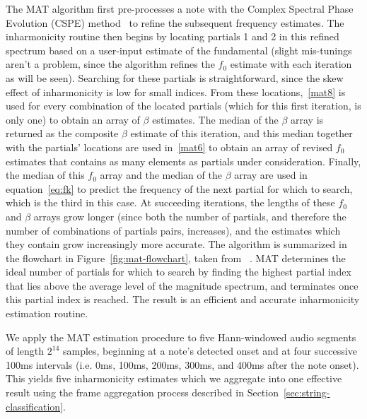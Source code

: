 \documentclass[12pt]{cmuthesis}
\begin{document}
The MAT algorithm first pre-processes a note with the Complex Spectral Phase Evolution (CSPE) method~\cite{short2006} to refine the subsequent frequency estimates. The inharmonicity routine then begins by locating partials 1 and 2 in this refined spectrum based on a user-input estimate of the fundamental (slight mis-tunings aren't a problem, since the algorithm refines the $f_0$ estimate with each iteration as will be seen). Searching for these partials is straightforward, since the skew effect of inharmonicity is low for small indices. From these locations,~\eqref{mat8} is used for every combination of the located partials (which for this first iteration, is only one) to obtain an array of $\beta$ estimates. The median of the $\beta$ array is returned as the composite $\beta$ estimate of this iteration, and this median together with the partials' locations are used in~\eqref{mat6} to obtain an array of revised $f_0$ estimates that contains as many elements as partials under consideration. Finally, the median of this $f_0$ array and the median of the $\beta$ array are used in equation~\eqref{eq:fk} to predict the frequency of the next partial for which to search, which is the third in this case. At succeeding iterations, the lengths of these $f_0$ and $\beta$ arrays grow longer (since both the number of partials, and therefore the number of combinations of partials pairs, increases), and the estimates which they contain grow increasingly more accurate. The algorithm is summarized in the flowchart in Figure~\ref{fig:mat-flowchart}, taken from ~\cite{hodgkinson2009}. MAT determines the ideal number of partials for which to search by finding the highest partial index that lies above the average level of the magnitude spectrum, and terminates once this partial index is reached. The result is an efficient and accurate inharmonicity estimation routine. 

We apply the MAT estimation procedure to five Hann-windowed audio segments of length $2^{14}$ samples, beginning at a note's detected onset and at four successive 100ms intervals (i.e. 0ms, 100ms, 200ms, 300ms, and 400ms after the note onset). This yields five inharmonicity estimates which we aggregate into one effective result using the frame aggregation process described in Section~\ref{sec:string-classification}.
\end{document}
